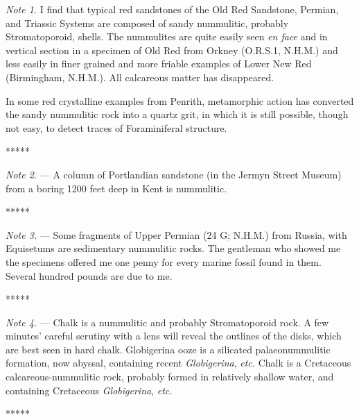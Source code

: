 \documentclass[a4paper, 12pt, oneside]{article}
\begin{document}
\emph{Note 1.} I find that typical red sandstones of the Old Red Sandstone, Permian, and Triassic Systems are composed of sandy nummulitic, probably Stromatoporoid, shells. The nummulites are quite easily seen \emph{en face} and in vertical section in a specimen of Old Red from Orkney (O.R.S.1, N.H.M.) and less easily in finer grained and more friable examples of Lower New Red (Birmingham, N.H.M.). All calcareous matter has disappeared.

In some red crystalline examples from Penrith, metamorphic action has converted the sandy nummulitic rock into a quartz grit, in which it is still possible, though not easy, to detect traces of Foraminiferal structure.

\centerline{*\hspace{15mm}*\hspace{15mm}*\hspace{15mm}*\hspace{15mm}*}
\bigskip

\emph{Note 2.} --- A column of Portlandian sandstone (in the Jermyn Street Museum) from a boring 1200 feet deep in Kent is nummulitic.

\centerline{*\hspace{15mm}*\hspace{15mm}*\hspace{15mm}*\hspace{15mm}*}
\bigskip

\emph{Note 3.} --- Some fragments of Upper Permian (24 G; N.H.M.) from Russia, with Equisetums are sedimentary nummulitic rocks. The gentleman who showed me the specimens offered me one penny for every marine fossil found in them. Several hundred pounds are due to me.

\centerline{*\hspace{15mm}*\hspace{15mm}*\hspace{15mm}*\hspace{15mm}*}
\bigskip

\emph{Note 4.} --- Chalk is a nummulitic and probably Stromatoporoid rock. A few minutes' careful scrutiny with a lens will reveal the outlines of the disks, which are best seen in hard chalk. Globigerina ooze is a silicated palaeonummulitic formation, now abyssal, containing recent \emph{Globigerina}, \emph{etc.} Chalk is a Cretaceous calcareous-nummulitic rock, probably formed in relatively shallow water, and containing Cretaceous \emph{Globigerina}, \emph{etc.}

\centerline{*\hspace{15mm}*\hspace{15mm}*\hspace{15mm}*\hspace{15mm}*}
\bigskip
\end{document}
